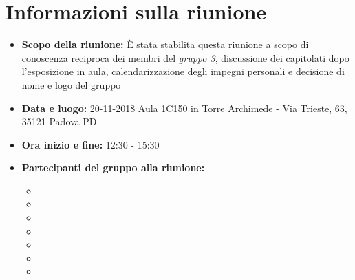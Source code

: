 \clearpage
\section{Informazioni sulla riunione}
\begin{itemize}
	\item \textbf {Scopo della riunione:} È stata stabilita questa riunione a scopo di conoscenza reciproca dei membri del \emph{gruppo 3}, discussione dei capitolati  dopo l’esposizione in aula, calendarizzazione degli impegni personali e decisione di nome e logo del gruppo
	
	\item \textbf {Data e luogo:} 20-11-2018 Aula 1C150 in Torre Archimede - Via Trieste, 63, 35121 Padova PD
	
	\item \textbf {Ora inizio e fine:} 12:30 - 15:30
	
	\item \textbf {Partecipanti del gruppo alla riunione:} 
		 \begin{itemize}
			\item \sonia
			\item \luca
			\item \matteo
			\item \pardeep
			\item \alberto
			\item \alessandro
			\item \andrea
		\end{itemize}
\end{itemize}